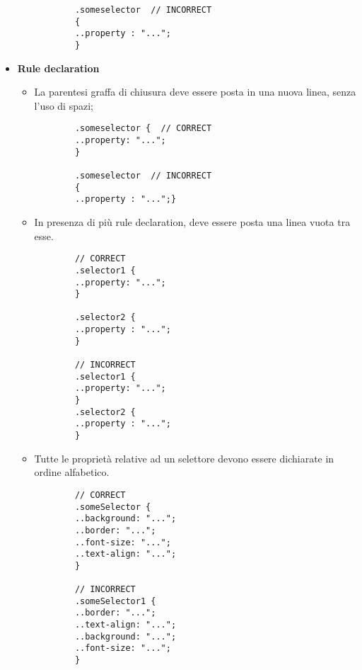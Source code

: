 \begin{itemize}
\begin{itemize}
\begin{lstlisting}
		.someselector  // INCORRECT
		{  
		..property : "...";
		}
		\end{lstlisting}
	\end{itemize}
	\item{\textbf{Rule declaration}}
	\begin{itemize}
		\item{La parentesi graffa di chiusura deve essere posta in una nuova linea, senza l'uso di spazi;}
		\begin{lstlisting}
		.someselector {  // CORRECT
		..property: "...";
		}
		
		.someselector  // INCORRECT
		{  
		..property : "...";}
		\end{lstlisting}
		
		\item{In presenza di più rule declaration, deve essere posta una linea vuota tra esse.}
		\begin{lstlisting}
		// CORRECT
		.selector1 {  
		..property: "...";
		}
		
		.selector2 {    
		..property : "...";
		}
		
		// INCORRECT
		.selector1 {  
		..property: "...";
		}
		.selector2 {    
		..property : "...";
		}
		\end{lstlisting}
		\item{Tutte le proprietà relative ad un selettore devono essere dichiarate in ordine alfabetico.}
		\begin{lstlisting}
		// CORRECT
		.someSelector {  
		..background: "...";
		..border: "...";
		..font-size: "...";
		..text-align: "...";
		}
		
		// INCORRECT
		.someSelector1 {  
		..border: "...";
		..text-align: "...";
		..background: "...";
		..font-size: "...";
		}
		\end{lstlisting}
	\end{itemize} 	
\end{itemize}

\pagebreak
